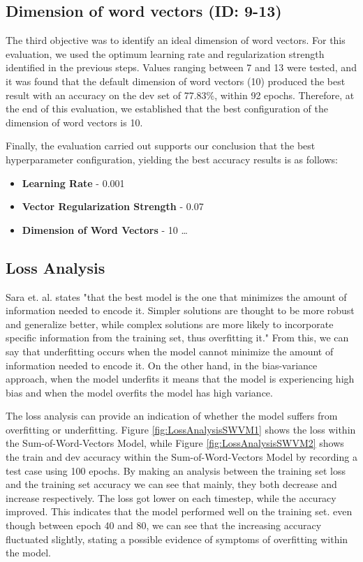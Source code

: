 \documentclass{article} %
\begin{document}
\subsection*{Dimension of word vectors (ID: 9-13)}

The third objective was to identify an ideal dimension of word vectors. For this evaluation, we used the optimum learning rate and regularization strength identified in the previous steps. Values ranging between 7 and 13 were tested, and it was found that the default dimension of word vectors (10) produced the best result with an accuracy on the dev set of 77.83\%, within 92 epochs. Therefore, at the end of this evaluation, we established that the best configuration of the dimension of word vectors is 10.

Finally, the evaluation carried out supports our conclusion that the best hyperparameter configuration, yielding the best accuracy results is as follows: 

\begin{itemize}
\item \textbf{Learning Rate} - 0.001
\item \textbf{Vector Regularization Strength} - 0.07
\item \textbf{Dimension of Word Vectors} - 10
\ldots
\end{itemize}

\subsection{Loss Analysis}

Sara et. al. \cite{silva2010measuring} states "that the best model is the one that minimizes the amount of information needed to encode it. Simpler solutions are thought to be more robust and generalize better, while complex solutions are more likely to incorporate specific information from the training set, thus overfitting it." From this, we can say that underfitting occurs when the model cannot minimize the amount of information needed to encode it. On the other hand, in the bias-variance approach, when the model underfits it means that the model is experiencing high bias and when the model overfits  the model has high variance.

The loss analysis can provide an indication of whether the model suffers from overfitting or underfitting. Figure \ref{fig:LossAnalysisSWVM1} shows the loss within the Sum-of-Word-Vectors Model, while Figure \ref{fig:LossAnalysisSWVM2} shows the train and dev accuracy within the Sum-of-Word-Vectors Model by recording a test case using 100 epochs. By making an analysis between the training set loss and the training set accuracy we can see that mainly, they both decrease and increase respectively. The loss got lower on each timestep, while the accuracy improved. This indicates that the model performed well on the training set. even though between epoch 40 and 80, we can see that the increasing accuracy fluctuated slightly, stating a possible evidence of symptoms of overfitting within the model.
\end{document}
